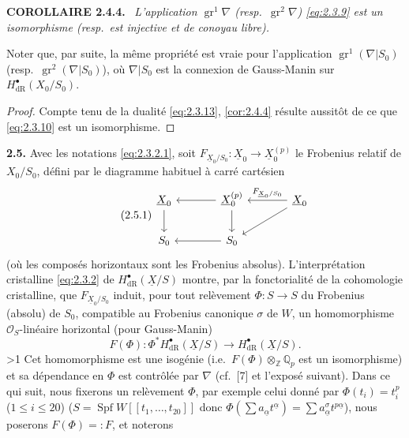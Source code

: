 \documentclass[10pt]{article}
\makeatletter
\DeclareMathOperator{\Spf}{Spf}
\DeclareMathOperator{\gr}{gr}
\newcommand{\UX}{\underline{X}}
\newcommand{\sourceanchor}[2]{\begingroup\def\@currentlabel{#2}\label{#1}\endgroup}
\newenvironment{sourcestatement}[3]{\par\smallskip\noindent\textbf{#1 #2.}\sourceanchor{#3}{#2}\ \itshape}{\par\normalfont\smallskip}
\newcommand{\DPage}[2]{\ifnum#1>1\clearpage\fi\setcounter{page}{#2}}
\makeatother
\begin{document}
\begin{sourcestatement}{COROLLAIRE}{2.4.4}{cor:2.4.4}
L'application $\gr^1 \nabla$ (resp.~$\gr^2 \nabla$) \eqref{eq:2.3.9} est un isomorphisme (resp.~est injective et de conoyau libre).
\end{sourcestatement}

Noter que, par suite, la même propriété est vraie pour l'application $\gr^1(\nabla|S_0)$ (resp.~$\gr^2(\nabla|S_0)$), où $\nabla|S_0$ est la connexion de Gauss-Manin sur $H^{\bullet}_{\mathrm{dR}}(X_0/S_0)$.

\begin{proof}
Compte tenu de la dualité \eqref{eq:2.3.13}, \ref{cor:2.4.4} résulte aussitôt de ce que \eqref{eq:2.3.10} est un isomorphisme.
\end{proof}

\noindent\textbf{2.5.}
Avec les notations \eqref{eq:2.3.2.1}, soit $F_{\UX_0/S_0}: \UX_0 \to \UX_0^{(p)}$ le Frobenius relatif de $X_0/S_0$, défini par le diagramme habituel à carré cartésien
\begin{equation}\tag{2.5.1}\label{eq:2.5.1}
\begin{tikzcd}[column sep=large,row sep=2em]
\UX_0\arrow[d] & \UX_0^{(p)}\arrow[l]\arrow[d] & \UX_0\arrow[l,"F_{\UX_0/S_0}"']\arrow[dl]\\
S_0 & S_0\arrow[l] &
\end{tikzcd}
\end{equation}
(où les composés horizontaux sont les Frobenius absolus). L'interprétation cristalline \eqref{eq:2.3.2} de $H^{\bullet}_{\mathrm{dR}}(\UX/S)$ montre, par la fonctorialité de la cohomologie cristalline, que $F_{\UX_0/S_0}$ induit, pour tout relèvement $\Phi: S \to S$ du Frobenius (absolu) de $S_0$, compatible au Frobenius canonique $\sigma$ de $W$, un homomorphisme $\mathcal{O}_S$-linéaire horizontal (pour Gauss-Manin)
\begin{equation}\tag{2.5.2}\label{eq:2.5.2}
F(\Phi): \Phi^* H^{\bullet}_{\mathrm{dR}}(\UX/S) \to H^{\bullet}_{\mathrm{dR}}(\UX/S).
\end{equation}
\DPage{13}{70}
Cet homomorphisme est une isogénie (i.e.~$F(\Phi) \otimes_{\mathbb{Z}} \mathbb{Q}_p$ est un isomorphisme) et sa dépendance en $\Phi$ est contrôlée par $\nabla$ (cf.~[7] et l'exposé suivant). Dans ce qui suit, nous fixerons un relèvement $\Phi$, par exemple celui donné par $\Phi(t_i) = t_i^p$ ($1 \leqslant i \leqslant 20$) ($S = \Spf W[[t_1, \ldots, t_{20}]]$ donc $\Phi(\sum a_{\underline{\alpha}} t^{\underline{\alpha}}) = \sum a^{\sigma}_{\underline{\alpha}} t^{p\underline{\alpha}}$), nous poserons $F(\Phi) =: F$, et noterons
\end{document}
